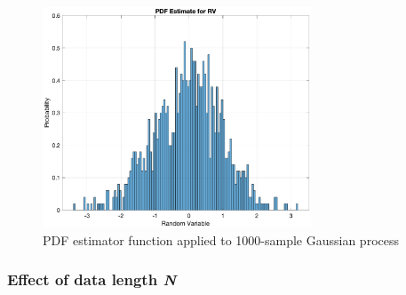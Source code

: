 \begin{figure}[H]
\begin{center}
    \includegraphics[width=8cm]{assignment1figs/gausspdf.eps}
    \caption{PDF estimator function applied to 1000-sample Gaussian process}
    \label{fig:pdfest1}
\end{center}
\end{figure}

\subsubsection{Effect of data length \textit{N}}

